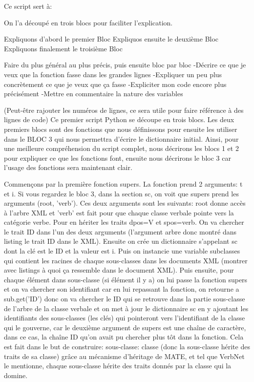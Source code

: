 Ce script sert à:

On l'a découpé en trois blocs pour faciliter l'explication.

Expliquons d'abord le premier Bloc 
Expliquos ensuite le deuxième Bloc
Expliquons finalement le troisième Bloc

Faire du plus général au plus précis, puis ensuite bloc par bloc
-Décrire ce que je veux que la fonction fasse dans les grandes lignes
-Expliquer un peu plus concrètement ce que je veux que ça fasse
-Expliciter mon code encore plus précisément
-Mettre en commentaire la nature des variables

(Peut-être rajouter les numéros de lignes, ce sera utile pour faire référence à des lignes de code)
Ce premier script Python se découpe en trois blocs. Les deux premiers blocs sont des fonctions que nous définissons pour ensuite les utiliser dans le BLOC 3 qui nous permettra d'écrire le dictionnaire initial.  Ainsi, pour une meilleure compréhension du script complet, nous décrirons les blocs 1 et 2 pour expliquer ce que les fonctions font, ensuite nous décrirons le bloc 3 car l'usage des fonctions sera maintenant clair.

Commençons par la première fonction supers. La fonction prend 2 arguments: t et i. Si vous regardez le bloc 3, dans la section sc, on voit que supers prend les arguments (root, 'verb'). Ces deux arguments sont les suivants: root donne accès à l'arbre XML et 'verb' est fait pour que chaque classe verbale pointe vers la catégorie verbe. Pour en hériter les traits dpos=V et spos=verb.  On va chercher le trait ID dans l'un des deux arguments (l'argument arbre donc montré dans listing le trait ID dans le XML). Ensuite on crée un dictionnaire s'appelant sc dont la clé est le ID et la valeur est i. Puis on instancie une variable subclasses qui contient les racines de chaque sous-classes dans les documents XML (montrer avec listings à quoi ça ressemble dans le document XML). Puis ensuite, pour chaque élément dans sous-classe (si élément il y a) on lui passe la fonction supers et on va chercher son identifiant car en lui repassant la fonction, on retourne a sub.get('ID') donc on va chercher le ID qui se retrouve dans la partie sous-classe de l'arbre de la classe verbale et on met à jour le dictionnaire sc en y ajoutant les identifiants des sous-classes (les clés) qui pointeront vers l'identifiant de la classe qui le gouverne, car le deuxième argument de supers est une chaîne de caractère, dans ce cas, la chaîne ID qu'on avait pu chercher plus tôt dans la fonction. Cela est fait dans le but de construire: sous-classe: classe (donc la sous-classe hérite des traits de sa classe) grâce au mécanisme d'héritage de MATE, et tel que VerbNet le mentionne, chaque sous-classe hérite des traits donnés par la classe qui la domine. 

